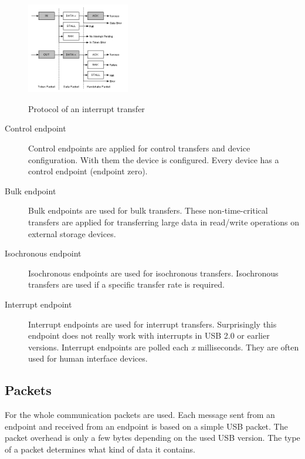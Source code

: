 \documentclass{acm_proc_article-sp}
\begin{document}
\begin{figure}[!h]
\centering
\includegraphics[width=0.4\textwidth]{interrupttransfer.png}
\label{fig:interrupttransfer}
\caption{Protocol of an interrupt transfer \cite{beyond}}
\end{figure}

\begin{description}
\item[Control endpoint]
Control endpoints are applied for control transfers and device configuration.
With them the device is configured.
Every device has a control endpoint (endpoint zero).

\item[Bulk endpoint]
Bulk endpoints are used for bulk transfers.
These non-time-critical transfers are applied for transferring large data
in read/write operations on external storage devices.

\item[Isochronous endpoint]
Isochronous endpoints are used for isochronous transfers.
Isochronous transfers are used if a specific transfer rate is required.

\item[Interrupt endpoint]
Interrupt endpoints are used for interrupt transfers.
Surprisingly this endpoint does not really work with interrupts in USB 2.0 or earlier versions.
Interrupt endpoints are polled each \emph{x} milliseconds.
They are often used for human interface devices.

\end{description}

\subsection{Packets}
For the whole communication packets are used.
Each message sent from an endpoint and received from an endpoint is based on a simple USB packet.
The packet overhead is only a few bytes depending on the used USB version.
The type of a packet determines what kind of data it contains.
\end{document}
